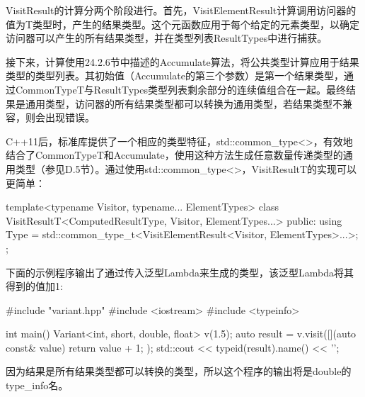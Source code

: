 VisitResult的计算分两个阶段进行。首先，VisitElementResult计算调用访问器的值为T类型时，产生的结果类型。这个元函数应用于每个给定的元素类型，以确定访问器可以产生的所有结果类型，并在类型列表ResultTypes中进行捕获。

接下来，计算使用24.2.6节中描述的Accumulate算法，将公共类型计算应用于结果类型的类型列表。其初始值（Accumulate的第三个参数）是第一个结果类型，通过CommonTypeT与ResultTypes类型列表剩余部分的连续值组合在一起。最终结果是通用类型，访问器的所有结果类型都可以转换为通用类型，若结果类型不兼容，则会出现错误。

C++11后，标准库提供了一个相应的类型特征，std::common\_type<>，有效地结合了CommonTypeT和Accumulate，使用这种方法生成任意数量传递类型的通用类型（参见D.5节）。通过使用std::common\_type<>，VisitResultT的实现可以更简单：

\begin{cpp}
template<typename Visitor, typename... ElementTypes>
class VisitResultT<ComputedResultType, Visitor, ElementTypes...> {
	public:
	using Type =
		std::common_type_t<VisitElementResult<Visitor, ElementTypes>...>;
};
\end{cpp}

下面的示例程序输出了通过传入泛型Lambda来生成的类型，该泛型Lambda将其得到的值加1:

\begin{cpp}
#include "variant.hpp"
#include <iostream>
#include <typeinfo>

int main() {
	Variant<int, short, double, float> v(1.5);
	auto result = v.visit([](auto const& value) {
							return value + 1;
						});
	std::cout << typeid(result).name() << '\n';
}
\end{cpp}

因为结果是所有结果类型都可以转换的类型，所以这个程序的输出将是double的type\_info名。







